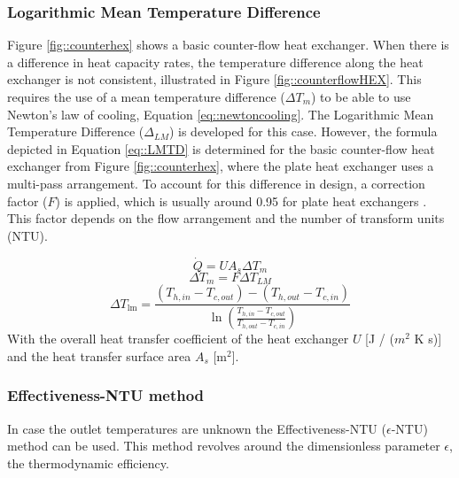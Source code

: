 \subsubsection{Logarithmic Mean Temperature Difference}

Figure \ref{fig::counterhex} shows a basic counter-flow heat exchanger. When there is a difference in heat capacity rates, the temperature difference along the heat exchanger is not consistent, illustrated in Figure \ref{fig::counterflowHEX}. This requires the use of a mean temperature difference ($\Delta T_m$) to be able to use Newton's law of cooling, Equation \ref{eq::newtoncooling}. 
The Logarithmic Mean Temperature Difference ($\Delta_{LM}$) is developed for this case. However, the formula depicted in Equation \ref{eq::LMTD} is determined for the basic counter-flow heat exchanger from Figure \ref{fig::counterhex}, where the plate heat exchanger uses a multi-pass arrangement. To account for this difference in design, a correction factor ($F$) is applied, which is usually around 0.95 for plate heat exchangers \cite{FemkeJanssenLit}. This factor depends on the flow arrangement and the number of transform units (NTU). 

\begin{equation}\label{eq::newtoncooling}
    \dot{Q} =  U A_{s} \Delta T_{m}
\end{equation}
\begin{equation}
    \Delta T_m = F \Delta T_{LM}
\end{equation}
\begin{equation}\label{eq::LMTD}
\Delta T_{\operatorname{lm}}=\frac{(T_{h,in} - T_{c,out}) - (T_{h,out} - T_{c,in})}{\ln \left(\frac{T_{h,in} - T_{c,out}}{T_{h,out} - T_{c,in}}\right)}
\end{equation}
With the overall heat transfer coefficient of the heat exchanger $U$ [J / ($m^2$ K  s)] and the heat transfer surface area $A_{s}$ [m$^2$].

\subsubsection{Effectiveness-NTU method}
In case the outlet temperatures are unknown the Effectiveness-NTU ($\epsilon$-NTU) method can be used. This method revolves around the dimensionless parameter $\epsilon$, the thermodynamic efficiency. 

